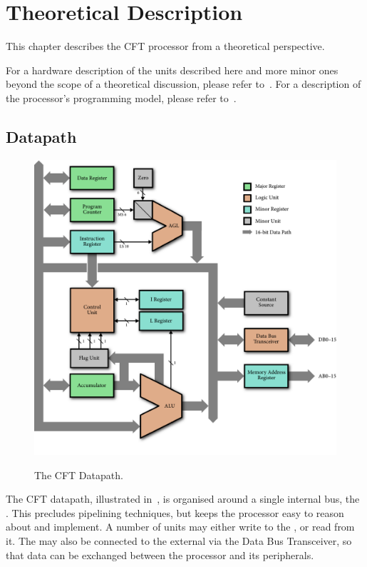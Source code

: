 \chapter{Theoretical Description}

This chapter describes the CFT processor from a theoretical
perspective.

For a hardware description of the units described here and more minor ones
beyond the scope of a theoretical discussion, please refer
to~. For a description of the
processor's programming model, please refer to~.


\section{Datapath}

\begin{figure}
\includegraphics[width=0.95\columnwidth]{figs/datapath2.pdf}\vspace{2em}\\
\caption[CFT Datapath]{\label{fig:datapath} The CFT Datapath. }
\end{figure}

The CFT datapath, illustrated in~, is organised around a
single internal bus, the \IBUS. This precludes pipelining techniques, but keeps
the processor easy to reason about and implement. A number of units may either
write to the \IBUS{}, or read from it. The \IBUS{} may also be connected to the
external \DBUS{} via the Data Bus Transceiver, so that data can be exchanged
between the processor and its peripherals.

